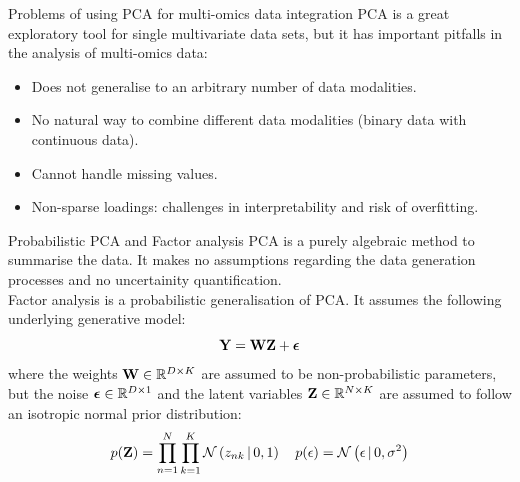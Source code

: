 \documentclass[aspectratio=169,notes]{beamer}
\begin{document}

	\begin{frame}{Problems of using PCA for multi-omics data integration}
	PCA is a great exploratory tool for single multivariate data sets, but it has important pitfalls in the analysis of multi-omics data:
	\begin{itemize}
		\item Does not generalise to an arbitrary number of data modalities.
		\item No natural way to combine different data modalities (binary data with continuous data).
		\item Cannot handle missing values.
		\item Non-sparse loadings: challenges in interpretability and risk of overfitting.
	\end{itemize}
	\end{frame}

	\begin{frame}{Probabilistic PCA and Factor analysis}
	PCA is a purely algebraic method to summarise the data. It makes no assumptions regarding the data generation processes and no uncertainity quantification.\\
	Factor analysis is a probabilistic generalisation of PCA. It assumes the following underlying generative model:
	\[
		{\bf Y} = {\bf W} {\bf Z} + \mbox{\boldmath $\epsilon$}
	\]
	where the weights ${\bf W} \in \mathbb{R}^{D \times K}$ are assumed to be non-probabilistic parameters, but the noise $\mbox{\boldmath $\epsilon$}  \in \mathbb{R}^{D \times 1}$ and the latent variables ${\bf Z} \in \mathbb{R}^{N \times K}$ are assumed to follow an isotropic normal prior distribution:
	\begin{align*}
		p({\bf Z}) = \prod_{n=1}^{N} \prod_{k=1}^{K} \mathcal{N}\left(z_{nk} \,|\, 0,1\right) \quad  
		p(\epsilon) = \mathcal{N}\left(\epsilon \,|\, 0,\sigma^{2}\right)
	\end{align*}
	\end{frame}
\end{document}
